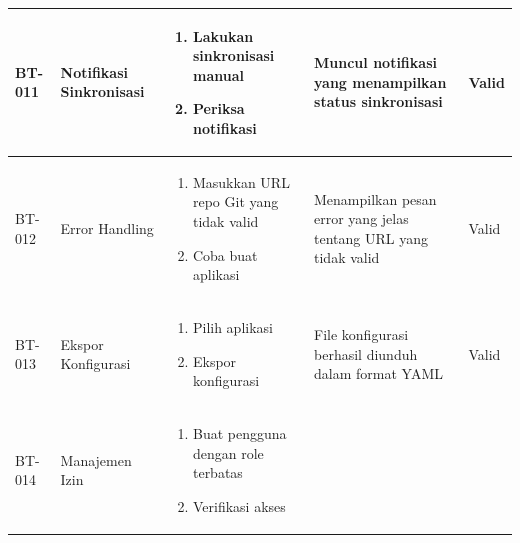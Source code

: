 \begin{table}[H]
\begin{adjustbox}{width=\textwidth}
\begin{tabular}{|p{0.8cm}|p{2.2cm}|p{4cm}|p{3.5cm}|p{1.2cm}|}
            BT-011            & Notifikasi Sinkronisasi & \begin{enumerate}[leftmargin=*,noitemsep,topsep=0pt,label=\arabic*.,widest=99]
                                                              \item Lakukan sinkronisasi manual
                                                              \item Periksa notifikasi
                                                          \end{enumerate} & Muncul notifikasi yang menampilkan status sinkronisasi              & Valid                                                                          \\ \hline
            BT-012            & Error Handling          & \begin{enumerate}[leftmargin=*,noitemsep,topsep=0pt,label=\arabic*.,widest=99]
                                                              \item Masukkan URL repo Git yang tidak valid
                                                              \item Coba buat aplikasi
                                                          \end{enumerate} & Menampilkan pesan error yang jelas tentang URL yang tidak valid     & Valid                                                                          \\ \hline
            BT-013            & Ekspor Konfigurasi      & \begin{enumerate}[leftmargin=*,noitemsep,topsep=0pt,label=\arabic*.,widest=99]
                                                              \item Pilih aplikasi
                                                              \item Ekspor konfigurasi
                                                          \end{enumerate} & File konfigurasi berhasil diunduh dalam format YAML                 & Valid                                                                          \\ \hline
            BT-014            & Manajemen Izin          & \begin{enumerate}[leftmargin=*,noitemsep,topsep=0pt,label=\arabic*.,widest=99]
                                                              \item Buat pengguna dengan role terbatas
                                                              \item Verifikasi akses

\end{enumerate}
\end{tabular}
\end{adjustbox}
\end{table}
